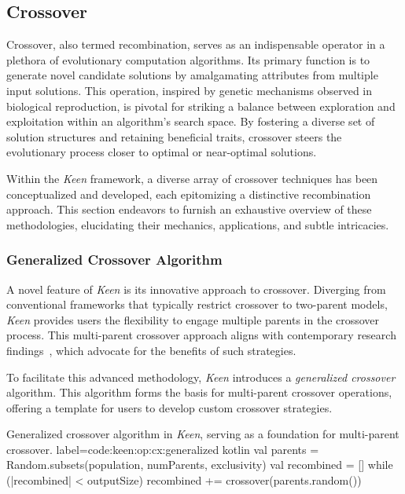 \subsection{Crossover}
\label{sec:keen:op:cx}
    Crossover, also termed recombination, serves as an indispensable operator in a plethora of evolutionary computation 
    algorithms. Its primary function is to generate novel candidate solutions by amalgamating attributes from multiple 
    input solutions. This operation, inspired by genetic mechanisms observed in biological reproduction, is pivotal for 
    striking a balance between exploration and exploitation within an algorithm's search space. By fostering a diverse 
    set of solution structures and retaining beneficial traits, crossover steers the evolutionary process closer to 
    optimal or near-optimal solutions.

    Within the \textit{Keen} framework, a diverse array of crossover techniques has been conceptualized and developed, 
    each epitomizing a distinctive recombination approach. This section endeavors to furnish an exhaustive overview of 
    these methodologies, elucidating their mechanics, applications, and subtle intricacies.

    
    \subsubsection{Generalized Crossover Algorithm}
    \label{sec:keen:op:cx:generalized}
        A novel feature of \textit{Keen} is its innovative approach to crossover. Diverging from conventional 
        frameworks that typically restrict crossover to two-parent models, \textit{Keen} provides users the flexibility 
        to engage multiple parents in the crossover process. This multi-parent crossover approach aligns with 
        contemporary research findings~\autocite{tsutsuiMultiparentRecombinationSimplex1999,elsayedGANewMultiparent2011,arramNovelMultiparentOrder2019}, which advocate for the benefits of such strategies.

        To facilitate this advanced methodology, \textit{Keen} introduces a \textit{generalized crossover} algorithm. 
        This algorithm forms the basis for multi-parent crossover operations, offering a template for users to develop 
        custom crossover strategies.

        \begin{code}{
            Generalized crossover algorithm in \textit{Keen}, serving as a foundation for multi-parent crossover.
        }{
            label=code:keen:op:cx:generalized
        }{kotlin}
            val parents = Random.subsets(population, numParents, exclusivity)
            val recombined = []
            while (|recombined| < outputSize) {
                recombined += crossover(parents.random())
            }
        \end{code}

